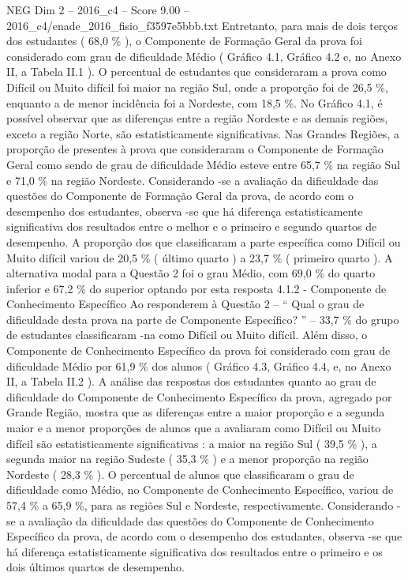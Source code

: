 \begin{textsample}{NEG Dim 2 – 2016\_c4 – Score 9.00 – 2016\_c4/enade\_2016\_fisio\_f3597e5bbb.txt}
Entretanto, para mais de dois terços dos estudantes ( 68,0 \% ), o Componente de Formação Geral da prova foi considerado com grau de dificuldade Médio ( Gráfico 4.1, Gráfico 4.2 e, no Anexo II, a Tabela II.1 ).
O percentual de estudantes que consideraram a prova como Difícil ou Muito difícil foi maior na região Sul, onde a proporção foi de 26,5 \%, enquanto a de menor incidência foi a Nordeste, com 18,5 \%.
No Gráfico 4.1, é possível observar que as diferenças entre a região Nordeste e as demais regiões, exceto a região Norte, são estatisticamente significativas.
Nas Grandes Regiões, a proporção de presentes à prova que consideraram o Componente de Formação Geral como sendo de grau de dificuldade Médio esteve entre 65,7 \% na região Sul e 71,0 \% na região Nordeste.
Considerando -se a avaliação da dificuldade das questões do Componente de Formação Geral da prova, de acordo com o desempenho dos estudantes, observa -se que há diferença estatisticamente significativa dos resultados entre o melhor e o primeiro e segundo quartos de desempenho.
A proporção dos que classificaram a parte específica como Difícil ou Muito difícil variou de 20,5 \% ( último quarto ) a 23,7 \% ( primeiro quarto ).
A alternativa modal para a Questão 2 foi o grau Médio, com 69,0 \% do quarto inferior e 67,2 \% do superior optando por esta resposta 4.1.2 - Componente de Conhecimento Específico Ao responderem à Questão 2 – “ Qual o grau de dificuldade desta prova na parte de Componente Específico? ” – 33,7 \% do grupo de estudantes classificaram -na como Difícil ou Muito difícil.
Além disso, o Componente de Conhecimento Específico da prova foi considerado com grau de dificuldade Médio por 61,9 \% dos alunos ( Gráfico 4.3, Gráfico 4.4, e, no Anexo II, a Tabela II.2 ).
A análise das respostas dos estudantes quanto ao grau de dificuldade do Componente de Conhecimento Específico da prova, agregado por Grande Região, mostra que as diferenças entre a maior proporção e a segunda maior e a menor proporções de alunos que a avaliaram como Difícil ou Muito difícil são estatisticamente significativas : a maior na região Sul ( 39,5 \% ), a segunda maior na região Sudeste ( 35,3 \% ) e a menor proporção na região Nordeste ( 28,3 \% ).
O percentual de alunos que classificaram o grau de dificuldade como Médio, no Componente de Conhecimento Específico, variou de 57,4 \% a 65,9 \%, para as regiões Sul e Nordeste, respectivamente.
Considerando -se a avaliação da dificuldade das questões do Componente de Conhecimento Específico da prova, de acordo com o desempenho dos estudantes, observa -se que há diferença estatisticamente significativa dos resultados entre o primeiro e os dois últimos quartos de desempenho.

\end{textsample}
